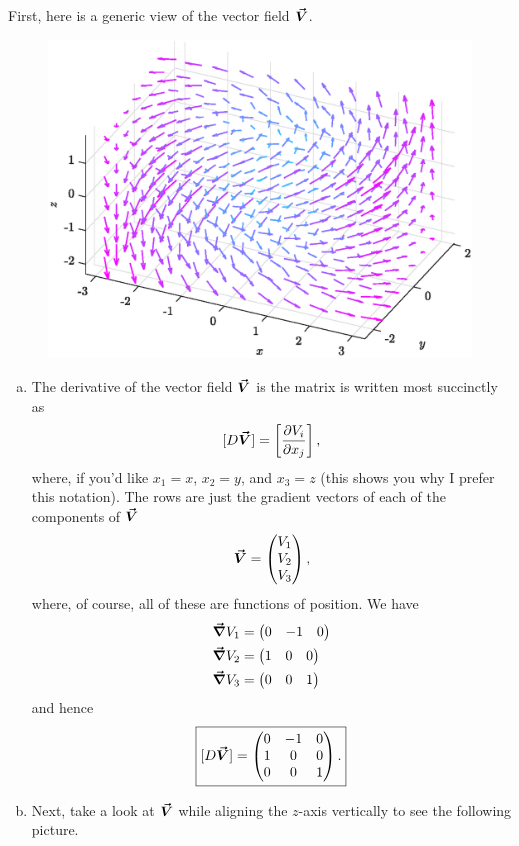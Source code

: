 \documentclass[12pt]{article} %
\begin{document}
\begin{solution}
First, here is a generic view of the vector field $\boldsymbol{\vec{V}}$.
        \begin{figure}[H]
        \centering
        \includegraphics[width=.65\textwidth]{Figures/6c_field}
    \end{figure}
\begin{enumerate}[(a)]
	\item The derivative of the vector field $\boldsymbol{\vec{V}}$ is the matrix is written most succinctly as
	\[
	[D\boldsymbol{\vec{V}}] = \left[ \frac{\partial V_i}{\partial x_j} \right],
	\]
	where, if you'd like $x_1=x$, $x_2=y$, and $x_3=z$ (this shows you why I prefer this notation). The rows are just the gradient vectors of each of the components of $\boldsymbol{\vec{V}}$
\[
\boldsymbol{\vec{V}} = \begin{pmatrix} V_1 \\ V_2 \\ V_3 \end{pmatrix},
\]
where, of course, all of these are functions of position. We have
\begin{align*}
\boldsymbol{\vec{\nabla}} V_1 &= \begin{pmatrix} 0 & -1 & 0 \end{pmatrix}\\
\boldsymbol{\vec{\nabla}} V_2 &= \begin{pmatrix} 1 & 0 & 0 \end{pmatrix}\\
\boldsymbol{\vec{\nabla}} V_3 &= \begin{pmatrix} 0 & 0 & 1 \end{pmatrix}
\end{align*}
and hence
\[
\boxed{ [D\boldsymbol{\vec{V}}]  = \begin{pmatrix} 0 & -1 & 0 \\ 1 & 0 & 0 \\ 0 & 0  & 1 \end{pmatrix}.}
\]
    \item Next, take a look at $\boldsymbol{\vec{V}}$ while aligning the $z$-axis vertically to see the following picture.

\end{enumerate}
\end{solution}
\end{document}
